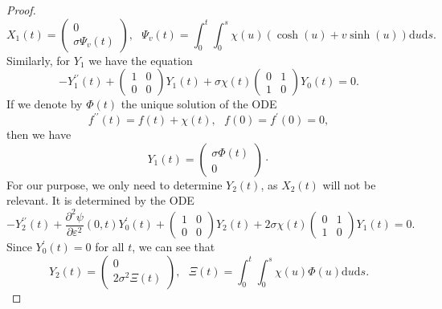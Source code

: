 \documentclass{article}
\numberwithin{equation}{section}        %
\theoremstyle{bfnote}
\theoremstyle{definition}
\theoremstyle{bfremark}
\begin{document}
\begin{proof}
    \begin{equation*}
        X_1(t) = \begin{pmatrix}
            0 \\ \sigma \Psi_v(t)
        \end{pmatrix}, ~~~ \Psi_v(t) = \int_0^t \int_0^s \chi(u)(\cosh(u) + v \sinh(u)) \mathrm{d}u\mathrm{d}s .
    \end{equation*}
    Similarly, for $Y_1$ we have the equation 
    \begin{equation*}
        - Y_1^{\prime\prime}(t) + \begin{pmatrix} 1 & 0 \\ 0 & 0\end{pmatrix}Y_1(t) + \sigma \chi(t) \begin{pmatrix} 0 & 1 \\ 1 & 0\end{pmatrix} Y_0(t) = 0 .
    \end{equation*}
    If we denote by $\Phi(t)$ the unique solution of the ODE
    \begin{equation*}
        f^{\prime\prime}(t) = f(t) + \chi(t), ~~~ f(0) = f^\prime(0) = 0,
    \end{equation*}
    then we have
    \begin{equation*}
        Y_1(t) = \begin{pmatrix}
            \sigma \Phi(t) \\ 0
        \end{pmatrix} \cdot
    \end{equation*}
    For our purpose, we only need to determine $Y_2(t)$, as $X_2(t)$ will not be relevant. It is determined by the ODE
    \begin{equation*}
        -Y_2^{\prime\prime}(t) + \frac{\partial^2\psi}{\partial\varepsilon^2}(0,t) Y_0^\prime(t) + \begin{pmatrix} 1 & 0 \\ 0 & 0 \end{pmatrix} Y_2(t) + 2 \sigma \chi(t) \begin{pmatrix} 0 & 1 \\ 1 & 0 \end{pmatrix} Y_1(t) = 0 .
    \end{equation*}
    Since $Y_0^\prime(t) = 0$ for all $t$, we can see that
    \begin{equation*}
        Y_2(t) = \begin{pmatrix}
            0 \\
            2 \sigma^2 \Xi(t)
        \end{pmatrix}, ~~~ \Xi(t) = \int_0^t \int_0^s \chi(u)\Phi(u)  \mathrm{d}u\mathrm{d}s .
    \end{equation*}


\end{proof}
\end{document}
